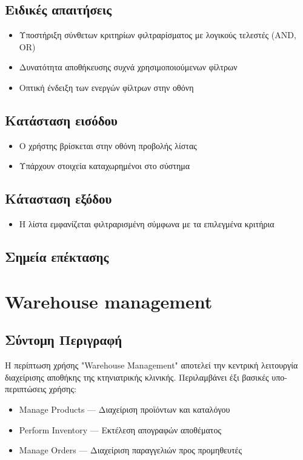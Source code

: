 \documentclass[12pt,a4paper,twoside]{book}
\begin{document}
\subsection{Ειδικές απαιτήσεις} %
\begin{itemize}
  \item Υποστήριξη σύνθετων κριτηρίων φιλτραρίσματος με λογικούς τελεστές (AND, OR)
  \item Δυνατότητα αποθήκευσης συχνά χρησιμοποιούμενων φίλτρων
  \item Οπτική ένδειξη των ενεργών φίλτρων στην οθόνη %
\end{itemize}

\subsection{Κατάσταση εισόδου} %
\begin{itemize}
  \item Ο χρήστης βρίσκεται στην οθόνη προβολής λίστας
  \item Υπάρχουν στοιχεία καταχωρημένοι στο σύστημα
\end{itemize}

\subsection{Κάτασταση εξόδου} %
\begin{itemize}
  \item Η λίστα εμφανίζεται φιλτραρισμένη σύμφωνα με τα επιλεγμένα κριτήρια
\end{itemize}

\subsection{Σημεία επέκτασης}

\section{Warehouse management}

\subsection{Σύντομη Περιγραφή}
Η περίπτωση χρήσης "Warehouse Management" αποτελεί την κεντρική λειτουργία διαχείρισης αποθήκης της κτηνιατρικής κλινικής. Περιλαμβάνει έξι βασικές υπο-περιπτώσεις χρήσης: %
\begin{itemize}
  \item Manage Products --- Διαχείριση προϊόντων και καταλόγου
  \item Perform Inventory --- Εκτέλεση απογραφών αποθέματος
  \item Manage Orders --- Διαχείριση παραγγελιών προς προμηθευτές
\end{itemize}
\end{document}
